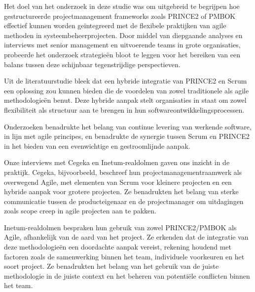 \documentclass[dutch]{hogent-article}
\begin{document}
Het doel van het onderzoek in deze studie was om uitgebreid te begrijpen hoe gestructureerde projectmanagement frameworks zoals PRINCE2 of PMBOK effectief kunnen worden geïntegreerd met de flexibele praktijken van agile methoden in systeembeheerprojecten. Door middel van \linebreak diepgaande analyses en interviews met senior management en uitvoerende teams in grote \linebreak organisaties, probeerde het onderzoek strategieën bloot te leggen voor het bereiken van een balans tussen deze schijnbaar tegenstrijdige perspectieven.
\newline

Uit de literatuurstudie bleek dat een hybride integratie van PRINCE2 en Scrum een oplossing zou kunnen bieden die de voordelen van zowel traditionele als agile methodologieën benut. Deze \linebreak hybride aanpak stelt organisaties in staat om zowel flexibiliteit als structuur aan te brengen in hun softwareontwikkelingsprocessen. 
\newline

Onderzoeken benadrukte het belang van continue levering van werkende software, in lijn met agile principes, en benadrukte de synergie tussen Scrum en PRINCE2 in het bieden van een evenwichtige en gestroomlijnde aanpak.
\newline

Onze interviews met Cegeka en Inetum-realdolmen gaven ons inzicht in de praktijk. Cegeka, bijvoorbeeld, beschreef hun projectmanagementraamwerk als overwegend Agile, met elementen van Scrum voor kleinere projecten en een hybride aanpak voor grotere projecten. Ze benadrukten het belang van sterke communicatie tussen de producteigenaar en de projectmanager om uitdagingen zoals scope creep in agile projecten aan te pakken.
\newline

Inetum-realdolmen bespraken hun gebruik van zowel PRINCE2/PMBOK als Agile, afhankelijk van de aard van het project. Ze erkenden dat de integratie van deze methodologieën een doordachte aanpak vereist, rekening houdend met factoren zoals de samenwerking binnen het team, individuele voorkeuren en het soort project. Ze benadrukten het belang van het gebruik van de juiste \linebreak methodologie in de juiste context en het beheren van potentiële conflicten binnen het team.
\newline
\end{document}
